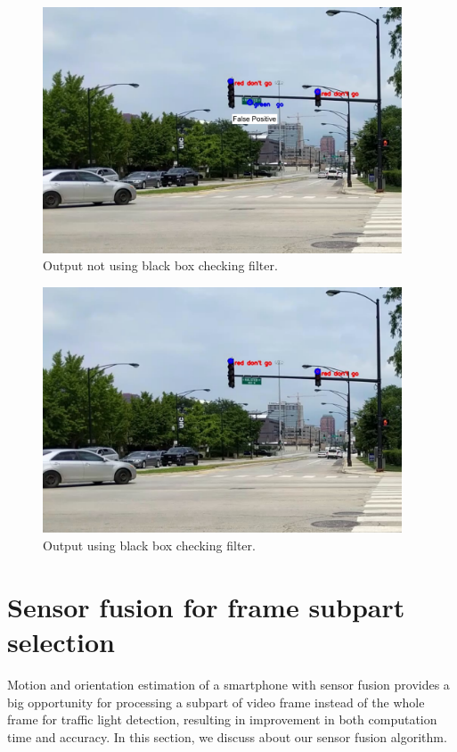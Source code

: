 \begin{figure}[!ht]
\centering
\includegraphics[width=4.2in]{images/norec_filter.pdf}
\caption{Output not using black box checking filter.}
\label{f:norec_filter}
\end{figure}



\begin{figure}[ht!]
\centering
\includegraphics[width=4.2in]{images/rec_filter.pdf}
\caption{Output using black box checking filter.}
\label{f:rec_filter}
\end{figure}




\section{Sensor fusion for frame subpart selection}
Motion and orientation estimation of a smartphone with sensor fusion provides a big opportunity for processing a subpart of video frame instead of the whole frame for traffic light detection, resulting in improvement in both computation time and accuracy.
In this section, we discuss about our sensor fusion algorithm. 

